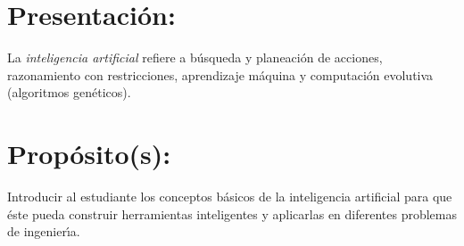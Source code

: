 \section{Presentaci\'{o}n:}

La {\em inteligencia artificial} refiere a b\'{u}squeda y
planeaci\'{o}n de acciones, razonamiento con restricciones,
aprendizaje m\'{a}quina y computaci\'{o}n evolutiva (algoritmos
gen\'{e}ticos).

\section{Prop\'{o}sito(s):}

Introducir al estudiante los conceptos b\'{a}sicos de la inteligencia
artificial para que \'{e}ste pueda construir herramientas inteligentes
y aplicarlas en diferentes problemas de ingenier\'{\i}a.
